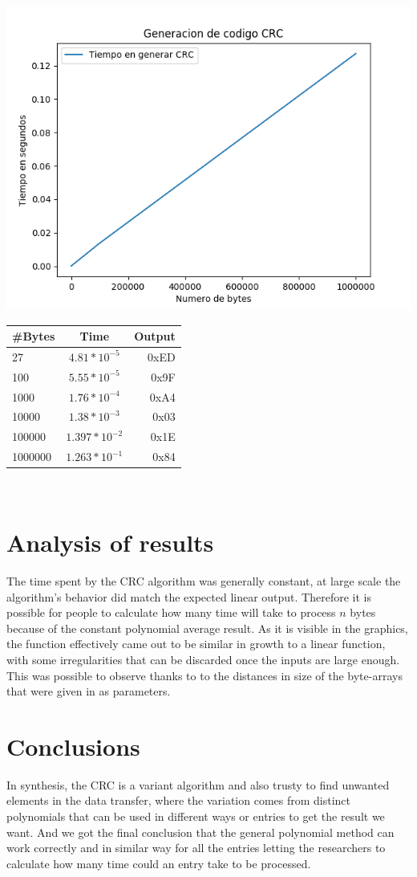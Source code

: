 \documentclass[10pt,twocolumn,letterpaper]{article}
\begin{document}
\includegraphics[scale=0.4]{figura2.png}\\
\begin{tabular}{ l | c | r }
  \hline			
  \#Bytes & Time & Output \\ \hline
  27 & $4.81*10^{-5}$ & 0xED \\
  100 & $5.55*10^{-5}$ & 0x9F \\
  1000 & $1.76*10^{-4}$ & 0xA4 \\
  10000 & $1.38*10^{-3}$ & 0x03 \\
  100000 & $1.397*10^{-2}$ & 0x1E \\
  1000000 & $1.263*10^{-1}$ & 0x84 \\
  \hline  
\end{tabular}\\
\section{Analysis of results}
The time spent by the CRC algorithm was generally constant, at large scale the algorithm's behavior did match the expected linear output. Therefore it is possible for people to calculate how many time will take to process $n$ bytes because of the constant polynomial average result.
As it is visible in the graphics, the function effectively came out to be similar in growth to a linear function, with some irregularities that can be discarded once the inputs are large enough. This was possible to observe thanks to to the distances in size of the byte-arrays that were given in as parameters.

\section{Conclusions}
In synthesis, the CRC is a variant algorithm and also trusty to find unwanted elements in the data transfer, where the variation comes from distinct polynomials that can be used in different ways or entries to get the result we want. And we got the final conclusion that the general polynomial method can work correctly and in similar way for all the entries letting the researchers to calculate how many time could an entry take to be processed.
\end{document}
